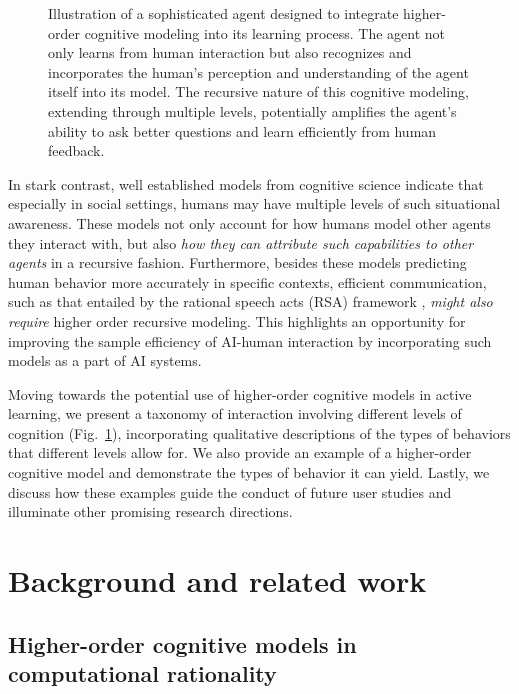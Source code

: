 \documentclass[letterpaper]{article} %
\begin{document}
\begin{figure}[t!]
	\centering
	\def\svgwidth{1\linewidth}
	{
 \fontsize{9}{9}
		}
	\caption{Illustration of a sophisticated agent designed to integrate higher-order cognitive modeling into its learning process. The agent not only learns from human interaction but also recognizes and incorporates the human's perception and understanding of the agent itself into its model. The recursive nature of this cognitive modeling, extending through multiple levels, potentially amplifies the agent's ability to ask better questions and learn efficiently from human feedback.}
	\label{fig:fig1}
\end{figure}

In stark contrast, well established models from cognitive science \cite{Stahl1995level-k, goodman2016rsa} indicate that especially in social settings, humans may have multiple levels of such situational awareness. These models not only account for how humans model other agents they interact with, but also \textit{how they can attribute such capabilities to other agents} in a recursive fashion. Furthermore, besides these models predicting human behavior more accurately in specific contexts, efficient communication, such as that entailed by the rational speech acts (RSA) framework \cite{goodman2016rsa}, \textit{might also require} higher order recursive modeling. This highlights an opportunity for improving the sample efficiency of AI-human interaction by incorporating such models as a part of AI systems.

Moving towards the potential use of higher-order cognitive models in active learning, we present a taxonomy of interaction involving different levels of cognition (Fig.~\ref{fig:fig1}), incorporating qualitative descriptions of the types of behaviors that different levels allow for. We also provide an example of a higher-order cognitive model and demonstrate the types of behavior it can yield. Lastly, we discuss how these examples guide the conduct of future user studies and illuminate other promising research directions.



\section{Background and related work}



\subsection{Higher-order cognitive models in computational rationality}
\end{document}

